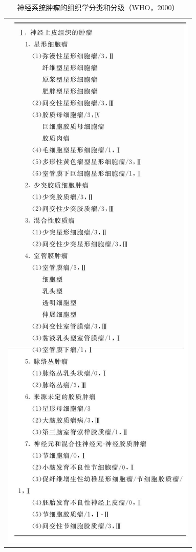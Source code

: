 \begin{longtable}{c}
\caption{神经系统肿瘤的组织学分类和分级（WHO，2000）}
\label{tab2-4}\\
\endfirsthead
\includegraphics[width=\textwidth,height=\textheight,keepaspectratio]{./images/Image00060.jpg}\\

\end{longtable}

